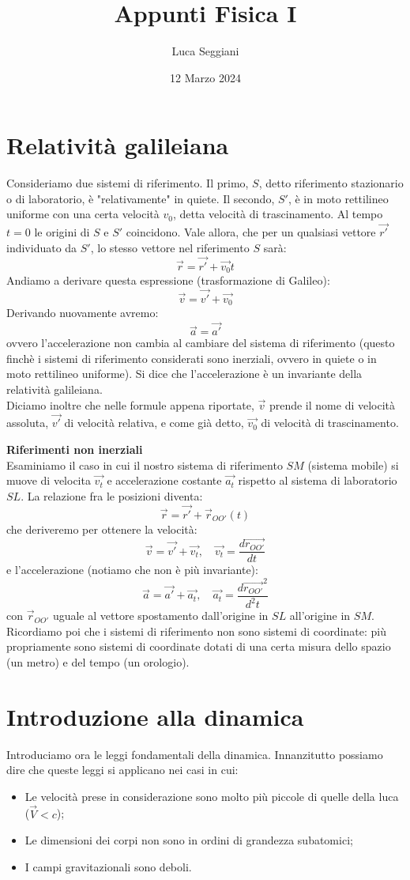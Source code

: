 \documentclass[a4paper,12pt]{article}
\title{Appunti Fisica I}
\author{Luca Seggiani}
\date{12 Marzo 2024}
\begin{document}
\maketitle
\section{Relatività galileiana}
Consideriamo due sistemi di riferimento. Il primo, $S$, detto riferimento stazionario o di laboratorio, è 
"relativamente" in quiete. Il secondo, $S'$, è in moto rettilineo uniforme con una certa velocità $v_0$, detta
velocità di trascinamento. Al tempo $t=0$ le origini di $S$ e $S'$ coincidono. Vale allora, che per un qualsiasi
vettore $\vec{r'}$ individuato da $S'$, lo stesso vettore nel riferimento $S$ sarà:
$$ \vec{r} = \vec{r'} + \vec{v_0}t$$
Andiamo a derivare questa espressione (trasformazione di Galileo):
$$ \vec{v} = \vec{v'} + \vec{v_0}$$
Derivando nuovamente avremo:
$$ \vec{a} = \vec{a'}$$
ovvero l'accelerazione non cambia al cambiare del sistema di riferimento (questo finchè i sistemi di riferimento
considerati sono inerziali, ovvero in quiete o in moto rettilineo uniforme). Si dice che l'accelerazione è un invariante
della relatività galileiana. \\
Diciamo inoltre che nelle formule appena riportate, $\vec{v}$ prende il nome di velocità assoluta, $\vec{v'}$ di velocità
relativa, e come già detto, $\vec{v_0}$ di velocità di trascinamento.
\par\smallskip
\textbf{Riferimenti non inerziali} \\
Esaminiamo il caso in cui il nostro sistema di riferimento $SM$ (sistema mobile) si muove di velocita $\vec{v_t}$ e accelerazione
costante $\vec{a_t}$ rispetto al sistema di laboratorio $SL$. La relazione fra le posizioni diventa:
$$ \vec{r} = \vec{r'} + \vec{r}_{OO'}(t) $$
che deriveremo per ottenere la velocità:
$$ \vec{v} = \vec{v'} + \vec{v_t}, \quad \vec{v_t} = \frac{d\vec{r_{OO'}}}{dt} $$
e l'accelerazione (notiamo che non è più invariante):
$$ \vec{a} = \vec{a'} + \vec{a_t}, \quad \vec{a_t} = \frac{d\vec{r_{OO'}}^2}{d^2t} $$
con $\vec{r}_{OO'}$ uguale al vettore spostamento dall'origine in $SL$ all'origine in $SM$. \\
Ricordiamo poi che i sistemi di riferimento non sono sistemi di coordinate: più propriamente sono sistemi di coordinate
dotati di una certa misura dello spazio (un metro) e del tempo (un orologio).

\section{Introduzione alla dinamica}
Introduciamo ora le leggi fondamentali della dinamica. Innanzitutto possiamo dire che queste leggi si applicano
nei casi in cui:
\begin{itemize}
  \item Le velocità prese in considerazione sono molto più piccole di quelle della luca ($\vec{V} < c$);
  \item Le dimensioni dei corpi non sono in ordini di grandezza subatomici;
  \item I campi gravitazionali sono deboli.
\end{itemize}
\end{document}
